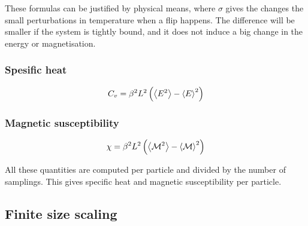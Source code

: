 \documentclass[11pt,a4paper,english,draft]{article}
\numberwithin{equation}{section}
\newcommand{\magM}{\mathcal{M}}
\begin{document}
These formulas can be justified by physical means, where $\sigma$ gives 
the changes the small perturbations in temperature when a flip happens.
The difference will be smaller if the system is tightly bound, and it 
does not induce a big change in the energy or magnetisation.

\subsubsection{Spesific heat}
\begin{equation}
C_v = \beta^2L^2\left(\expval{E^2} - \expval{E}^2\right)
\end{equation}

\subsubsection{Magnetic susceptibility}
\begin{equation}
\chi = \beta^2 L^2 \left(\expval{\magM^2} - \expval{\magM}^2\right)
\end{equation}

All these quantities are computed per particle and divided by the number 
of samplings. This gives specific heat and magnetic susceptibility 
per particle.

\subsection{Finite size scaling}
\end{document}
